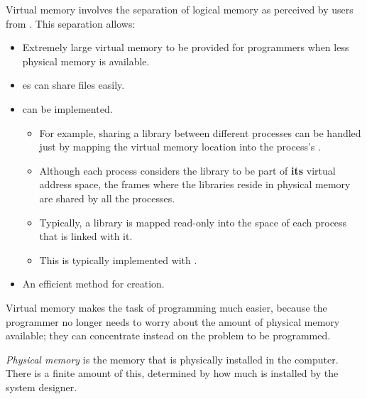 \begin{definition}\label{def:Virtual_Memory}
  Virtual memory involves the separation of logical memory as perceived by users from .
  This separation allows:
  \begin{itemize}[noitemsep]
  \item Extremely large virtual memory to be provided for programmers when less physical memory is available.
  \item {}es can share files easily.
  \item {} can be implemented.
    \begin{itemize}[noitemsep]
    \item For example, sharing a library between different processes can be handled just by mapping the virtual memory location into the process's .
    \item Although each process considers the library to be part of \textbf{its} virtual address space, the frames where the libraries reside in physical memory are shared by all the processes.
    \item Typically, a library is mapped read-only into the space of each process that is linked with it.
    \item This is typically implemented with .
    \end{itemize}
  \item An efficient method for  creation.
\end{itemize}

  Virtual memory makes the task of programming much easier, because the programmer no longer needs to worry about the amount of physical memory available; they can concentrate instead on the problem to be programmed.
\end{definition}

\begin{definition}\label{def:Physical_Memory}
  \emph{Physical memory} is the memory that is physically installed in the computer.
  There is a finite amount of this, determined by how much is installed by the system designer.
\end{definition}

